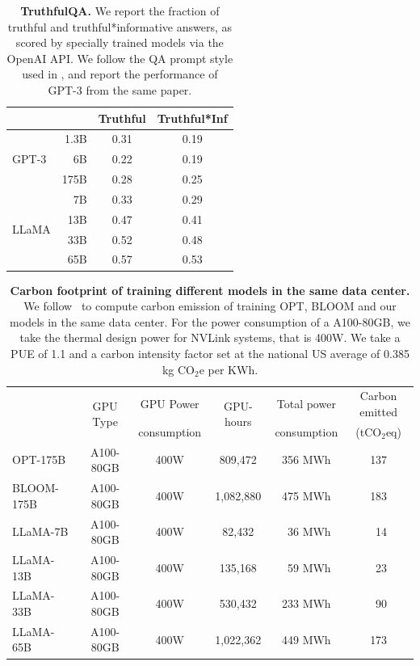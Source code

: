 \documentclass[11pt]{article}
\newcommand{\model}{LLaMA\xspace}%
\begin{document}
\begin{table}[t]
  \center
  \begin{tabular}{@{}lr  cc@{}}
  \toprule
            &       & Truthful & Truthful*Inf \\ %
  \midrule
  \multirow{3}{*}{GPT-3}
                & 1.3B  & 0.31 & 0.19 \\
                & 6B    & 0.22 & 0.19 \\
                & 175B  & 0.28 & 0.25 \\
  \midrule
  \multirow{4}{*}{\model}
                & 7B  & 0.33 & 0.29 \\
                & 13B & 0.47 & 0.41 \\
                & 33B & 0.52 & 0.48 \\
                & 65B & 0.57 & 0.53 \\
  \bottomrule
  \end{tabular}
  \caption{\textbf{TruthfulQA.} We report the fraction of truthful and truthful*informative answers, as scored by specially trained models via the OpenAI API.  We follow the QA prompt style used in \citet{ouyang2022training}, and report the performance of GPT-3 from the same paper.
  }
  \label{tab:TuthfulQA}
\end{table}




\begin{table}[t]
    \centering
    \begin{tabular}{l ccccc}
    \toprule
         & \multirow{2}{*}{GPU Type} & GPU Power &  \multirow{2}{*}{GPU-hours} & Total power  & Carbon emitted\\
         &  & consumption &       &  consumption & (tCO$_2$eq)\\
\midrule
OPT-175B    & A100-80GB & 400W & 809,472 & 356 MWh & 137 \\
BLOOM-175B  & A100-80GB & 400W & 1,082,880 & 475 MWh & 183\\
\midrule
\model-7B   & A100-80GB & 400W & 82,432 & ~36 MWh & ~14 \\
\model-13B  & A100-80GB & 400W & 135,168 & ~59 MWh & ~23 \\
\model-33B  & A100-80GB & 400W & 530,432 & 233 MWh & ~90 \\
\model-65B & A100-80GB & 400W & 1,022,362 & 449 MWh & 173 \\       
     \bottomrule
    \end{tabular}
    \caption{
    \textbf{Carbon footprint of training different models in the same data center.}
    We follow~\citet{wu2022sustainable} to compute carbon emission of training OPT, BLOOM and our models in the same data center. For the power consumption of a A100-80GB, we take the thermal design power for NVLink systems, that is 400W. We take a PUE of 1.1 and a carbon intensity factor set at the national US average of 0.385 kg CO$_2$e per KWh.
    \label{tab:cf}
    \vspace{-0.5em}
    }
\end{table}
\end{document}
